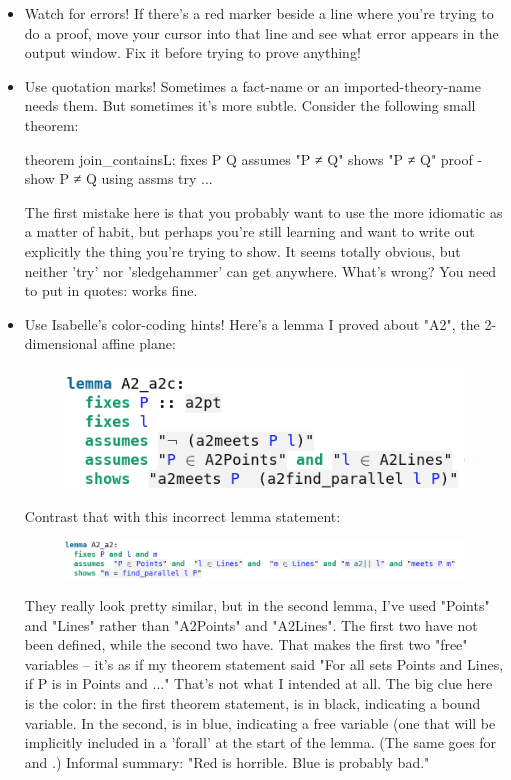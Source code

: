 \begin{itemize}
    \item Watch for errors! If there's a red marker beside a line where you're trying to do a proof, move your cursor into that line and see what error appears in the output window. Fix it before trying to prove anything!

    \item Use quotation marks! Sometimes a fact-name or an imported-theory-name needs them. But sometimes it's more subtle. Consider the following small theorem:
\begin{IS}    
theorem join_containsL:
  fixes P Q
  assumes "P ≠ Q"
  shows "P ≠ Q"
proof -
  show P ≠ Q using assms try 
...
\end{IS}
The first mistake here is that you probably want to use the more idiomatic  as a matter of habit, but perhaps you're still learning and want to write out explicitly the thing you're trying to show. It seems totally obvious, but neither 'try' nor 'sledgehammer' can get anywhere. What's wrong? You need to put  in quotes:
 works fine. 

\item Use Isabelle's color-coding hints! Here's a lemma I proved about "A2", the 2-dimensional affine plane:
\begin{figure}[h]
    \includegraphics[width=0.5\linewidth]{C03/Images/good-statement.png}
\end{figure}

Contrast that with this incorrect lemma statement:
\begin{figure}[h]
    \includegraphics[width=\linewidth]{C03/Images/bad-statement.png}
\end{figure}
They really look pretty similar, but in the second lemma, I've used "Points" and "Lines" rather than "A2Points" and "A2Lines". The first two have not been defined, while the second two have. That makes the first two "free" variables -- it's as if my theorem statement said "For all sets Points and Lines, if P is in Points and ..."
That's not what I intended at all. The big clue here is the color: in the first theorem statement,  is in black, indicating a bound variable. In the second,  is in blue, indicating a free variable (one that will be implicitly included in a 'forall' at the start of the lemma. (The same goes for  and .) Informal summary: "Red is horrible. Blue is probably bad." 


\end{itemize}

